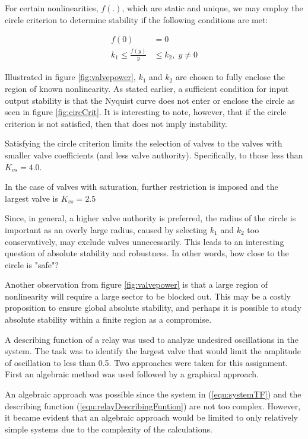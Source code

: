 \documentclass[a4paper, titlepage]{article}
\begin{document}
For certain nonlinearities, $f(.)$, which are static and unique, we may employ the circle criterion to determine stability if the following conditions are met:

\begin{equation}
\begin{split}
f(0) &= 0 \\
k_{1} {\leq} \frac{f(y)}{y} &{\leq} k_{2}, \; y {\neq} 0
\end{split}
\end{equation}

Illustrated in figure \ref{fig:valvepower}, $k_{1}$ and $k_{2}$ are chosen to fully enclose the region of known nonlinearity.  As stated earlier, a sufficient condition for input output stability is that the Nyquist curve does not enter or enclose the circle as seen in figure \ref{fig:circCrit}. It is interesting to note, however, that if the circle criterion is not satisfied, then that does not imply instability.   

Satisfying the circle criterion limits the selection of valves to the valves with smaller valve coefficients (and less valve authority).  Specifically, to those less than $K_{vs}=4.0$.

In the case of valves with saturation, further restriction is imposed and the largest valve is $K_{vs}=2.5$

Since, in general, a higher valve authority is preferred, the radius of the circle is important as an overly large radius, caused by selecting $k_{1}$ and $k_{2}$ too conservatively,  may exclude valves unnecessarily. This leads to an interesting question of absolute stability and robustness.  In other words, how close to the circle is "safe"?

Another observation from figure \ref{fig:valvepower} is that a large region of nonlinearity will require a large sector to be blocked out.  This may be a costly proposition to ensure global absolute stability, and perhaps it is possible to study absolute stability within a finite region as a compromise.

A describing function of a relay was used to analyze undesired oscillations in the system.  The task was to identify the largest valve that would limit the amplitude of oscillation to less than 0.5.
Two approaches were taken for this assignment.  First an algebraic method was used followed by a graphical approach.

An algebraic approach was possible since the system in (\ref{equ:systemTF}) and the describing function (\ref{equ:relayDescribingFuntion}) are not too complex.  However, it became evident that an algebraic approach would be limited to only relatively simple systems due to the complexity of the calculations.
\end{document}
